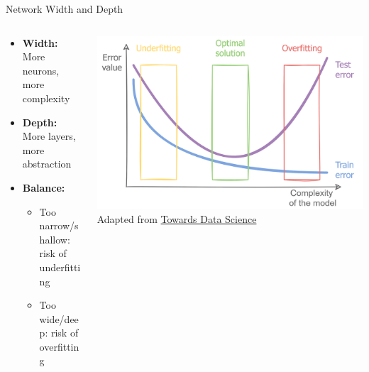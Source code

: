 \documentclass[serif, aspectratio=169]{beamer}
\begin{document}
\begin{frame}[t]{Network Width and Depth}
    \begin{columns}
        \begin{column}{0.6\textwidth}
            \begin{itemize}
                \item \textbf{Width:} More neurons, more complexity
                \item \textbf{Depth:} More layers, more abstraction
                \item \textbf{Balance:} 
                \begin{itemize}
                    \item Too narrow/shallow: risk of underfitting
                    \item Too wide/deep: risk of overfitting
                \end{itemize}
            \end{itemize}
        \end{column}
        \begin{column}{0.5\textwidth}
            \begin{center}
                \includegraphics[keepaspectratio, width=\textwidth]{pic/3/complexity.png} \\
                {\scriptsize Adapted from \href{https://towardsdatascience.com/overfitting-and-underfitting-principles-ea8964d9c45c}{Towards Data Science}}
            \end{center}
        \end{column}
    \end{columns}
\end{frame}
\end{document}
